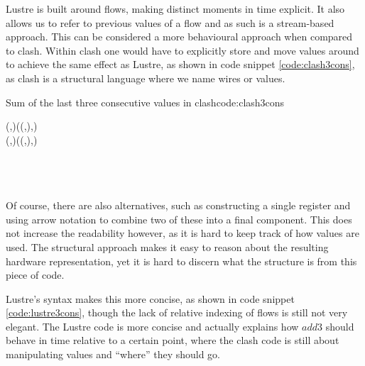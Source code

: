 Lustre is built around flows, making distinct moments in time explicit. 
It also allows us to refer to previous values of a flow and as such is a stream-based approach.
This can be considered a more behavioural approach when compared to \gls{clash}.
Within \gls{clash} one would have to explicitly store and move values around to achieve the same effect as Lustre, as shown in code snippet \ref{code:clash3cons}, as \gls{clash} is a structural language where we name wires or values.
\begin{texexptitled}{Sum of the last three consecutive values in \gls{clash}}{code:clash3cons}
\begin{hscode}\SaveRestoreHook
{}%
%
%
%
\>[B]{}\mathbin{::}(,)\to {}\to ((,),){}\<[E]%
\\
\>[B]{}\;(,)\;\mathrel{=}((,),){}\<[E]%
\\
\>[B]{}\<[5]%
\>[5]{}\<[E]%
\\
\>[5]{}\<[9]%
\>[9]{}\mathrel{=}\<[E]%
\\
\>[5]{}\<[9]%
\>[9]{}\mathrel{=}\<[E]%
\\
\>[5]{}\<[9]%
\>[9]{}\mathrel{=}\mathbin{+}\mathbin{+}\<[E]%
\ColumnHook
\end{hscode}\resethooks
\end{texexptitled}

Of course, there are also alternatives, such as constructing a single register and using arrow notation to combine two of these into a final component. 
This does not increase the readability however, as it is hard to keep track of how values are used.
The structural approach makes it easy to reason about the resulting hardware representation, yet it is hard to discern what the structure is from this piece of code.

Lustre's syntax makes this more concise, as shown in code snippet \ref{code:lustre3cons}, though the lack of relative indexing of flows is still not very elegant.
The Lustre code is more concise and actually explains how $add3$ should behave in time relative to a certain point, where the \gls{clash} code is still about manipulating values and ``where'' they should go.

